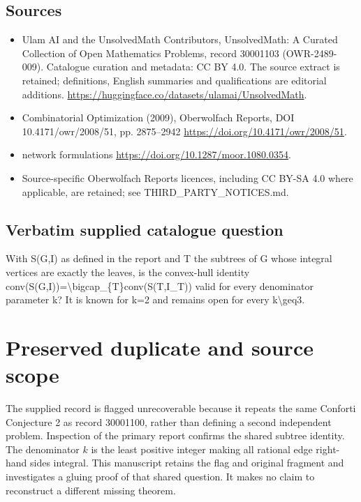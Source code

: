 \documentclass[11pt]{article}
\begin{document}
\subsection{Sources}
\begin{itemize}
\item[S1] Ulam AI and the UnsolvedMath Contributors, UnsolvedMath: A Curated Collection of Open Mathematics Problems, record 30001103 (OWR-2489-009). Catalogue curation and metadata: CC BY 4.0. The source extract is retained; definitions, English summaries and qualifications are editorial additions.
\url{https://huggingface.co/datasets/ulamai/UnsolvedMath}.
\item[S2] Combinatorial Optimization (2009), Oberwolfach Reports, DOI 10.4171/owr/2008/51, pp. 2875--2942
\url{https://doi.org/10.4171/owr/2008/51}.
\item[S3] network formulations
\url{https://doi.org/10.1287/moor.1080.0354}.
\item Source-specific Oberwolfach Reports licences, including CC BY-SA 4.0 where applicable, are retained; see THIRD\_PARTY\_NOTICES.md.
\end{itemize}
\subsection{Verbatim supplied catalogue question}
With S(G,I) as defined in the report and T the subtrees of G whose integral vertices are exactly the leaves, is the convex-hull identity conv(S(G,I))=\textbackslash{}bigcap\_\{T\}conv(S(T,I\_T)) valid for every denominator parameter k? It is known for k=2 and remains open for every k\textbackslash{}geq3.

\section{Preserved duplicate and source scope}
The supplied record is flagged unrecoverable because it repeats the same
Conforti Conjecture 2 as record 30001100, rather than defining a second
independent problem. Inspection of the primary report confirms the shared
subtree identity. The denominator $k$ is the least positive integer making
all rational edge right-hand sides integral. This manuscript retains the
flag and original fragment and investigates a gluing proof of that shared
question. It makes no claim to reconstruct a different missing theorem.
\end{document}
